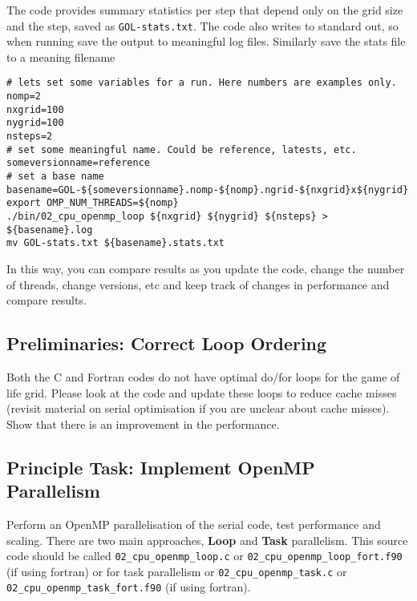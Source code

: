 \documentclass[11pt]{amsart}
\begin{document}
The code provides summary statistics per step that depend only on the grid size and the step, saved as {\color{blue}\texttt{GOL-stats.txt}}. The code also writes to standard out, so when running save the output to meaningful log files. Similarly save the stats file to a meaning filename 
\begin{center}
\begin{minipage}{0.95\textwidth}
\begin{verbatim}
# lets set some variables for a run. Here numbers are examples only.
nomp=2
nxgrid=100
nygrid=100
nsteps=2
# set some meaningful name. Could be reference, latests, etc. 
someversionname=reference
# set a base name 
basename=GOL-${someversionname}.nomp-${nomp}.ngrid-${nxgrid}x${nygrid}.${nsteps}
export OMP_NUM_THREADS=${nomp}
./bin/02_cpu_openmp_loop ${nxgrid} ${nygrid} ${nsteps} > ${basename}.log
mv GOL-stats.txt ${basename}.stats.txt
\end{verbatim}
\end{minipage}
\end{center}
In this way, you can compare results as you update the code, change the number of threads, change versions, etc and keep track of changes in performance and compare results. 

\subsection{{\color{Red} Preliminaries}: Correct Loop Ordering\nopunct\\}\label{sec:tasks:loop}
Both the C and Fortran codes do not have optimal do/for loops for the game of life grid. Please look at the code and update these loops to reduce cache misses (revisit material on serial optimisation if you are unclear about cache misses). Show that there is an improvement in the performance. 

\subsection{{\color{Red} Principle Task}: Implement OpenMP Parallelism\nopunct\\}\label{sec:tasks:omp}
Perform an OpenMP parallelisation of the serial code, test performance and scaling. There are two main approaches, {\color{Orange}\textbf{Loop}} and {\color{Orange}\textbf{Task}} parallelism. This source code should be called \texttt{02\_cpu\_openmp\_loop.c} or \texttt{02\_cpu\_openmp\_loop\_fort.f90} (if using fortran) or for task parallelism or \texttt{02\_cpu\_openmp\_task.c} or \texttt{02\_cpu\_openmp\_task\_fort.f90} (if using fortran). 
\end{document}
